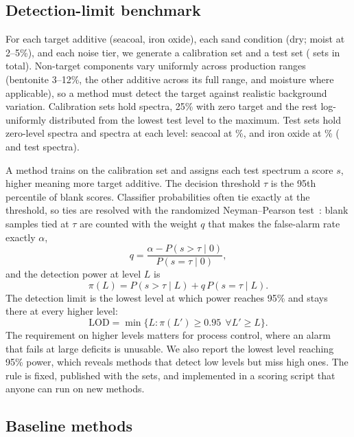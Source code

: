 \documentclass[10pt,twocolumn,letterpaper]{article}
\begin{document}
\subsection{Detection-limit benchmark}\label{sec:bench}

For each target additive (seacoal, iron oxide), each sand condition (dry; moist at 2--5\%), and each noise tier, we generate a calibration set and a test set (\nSets{} sets in total). Non-target components vary uniformly across production ranges (bentonite 3--12\%, the other additive across its full range, and moisture where applicable), so a method must detect the target against realistic background variation. Calibration sets hold \nCal{} spectra, 25\% with zero target and the rest log-uniformly distributed from the lowest test level to the maximum. Test sets hold \nTestBlank{} zero-level spectra and \nTestLevel{} spectra at each level: seacoal at \levelsSc\%, and iron oxide at \levelsFe\% (\nTestSc{} and \nTestFe{} test spectra).

A method trains on the calibration set and assigns each test spectrum a score $s$, higher meaning more target additive. The decision threshold $\tau$ is the 95th percentile of blank scores. Classifier probabilities often tie exactly at the threshold, so ties are resolved with the randomized Neyman--Pearson test~\cite{lehmann2005}: blank samples tied at $\tau$ are counted with the weight $q$ that makes the false-alarm rate exactly $\alpha$,
\begin{equation}
q=\frac{\alpha-P(s>\tau\mid0)}{P(s=\tau\mid0)},
\end{equation}
and the detection power at level $L$ is
\begin{equation}
\pi(L)=P(s>\tau\mid L)+q\,P(s=\tau\mid L).
\end{equation}
The detection limit is the lowest level at which power reaches 95\% and stays there at every higher level:
\begin{equation}
\mathrm{LOD}=\min\{L:\pi(L')\ge0.95\ \ \forall L'\ge L\}.\label{eq:lod}
\end{equation}
The requirement on higher levels matters for process control, where an alarm that fails at large deficits is unusable. We also report the lowest level reaching 95\% power, which reveals methods that detect low levels but miss high ones. The rule is fixed, published with the sets, and implemented in a scoring script that anyone can run on new methods.

\subsection{Baseline methods}
\end{document}
